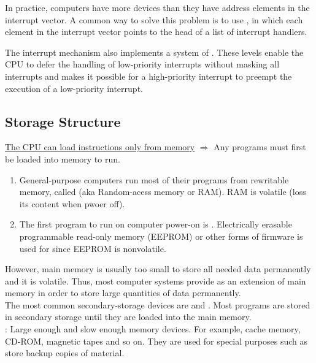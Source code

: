 In practice, computers have more devices than they have address elements in the interrupt vector. A common way to solve this problem is to use , in which each element in the interrupt vector points to the head of a list of interrupt handlers.


The interrupt mechanism also implements a system of . These levels enable the CPU to defer the handling of low-priority interrupts without masking all interrupts and makes it possible for a high-priority
interrupt to preempt the execution of a low-priority interrupt.

\subsection{Storage Structure}

\hf \underline{The CPU can load instructions only from memory} $\Rightarrow$ Any programs must first be loaded into memory to run. 

\begin{enumerate}
	\item General-purpose computers run most of their programs from rewritable memory, called (aka Random-acess memory or RAM). RAM is volatile (loss its content when pwoer off).
	\item The first program to run on computer power-on is . Electrically erasable programmable read-only memory (EEPROM) or other forms of firmware is used for  since EEPROM is nonvolatile.
\end{enumerate}

However, main memory is usually too small to store all needed data permanently and  it is volatile. Thus, most computer systems provide  as an extension of main memory in order to store large quantities of data permanently.\\

The most common secondary-storage devices are  and . Most programs are stored in secondary storage until they are loaded into the main memory.\\

: Large enough and slow enough memory devices. For example, cache memory, CD-ROM, magnetic tapes and so on. They are used for special purposes such as store backup copies of material.\\


